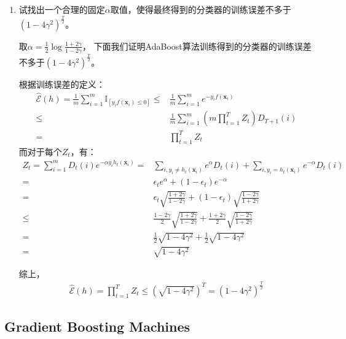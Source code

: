 \documentclass[12pt, a4paper]{article}
\newcommand{\vv}[1]{{\bm{#1}}}
\newcommand{\EE}{{\mathcal{E}}}
\newcommand{\unit}{{\mathbb{I}}}
\begin{document}
        \begin{enumerate}

        \item 试找出一个合理的固定$\alpha$取值，使得最终得到的分类器的训练误差不多于$(1 - 4 \gamma^2)^{\frac{T}{2}}$。

            取$\alpha = \frac{1}{2} \log \frac{1 + 2 \gamma}{1 - 2 \gamma}$，
            下面我们证明AdaBoost算法训练得到的分类器的训练误差不多于$(1 - 4 \gamma^2)^{\frac{T}{2}}$。

            根据训练误差的定义：
            \begin{align*}
            \hat{\EE}(h) = \frac{1}{m} \sum_{i = 1}^{m} \unit_{[y_i f(\vv{x}_i) \le 0]}
            \le& \frac{1}{m} \sum_{i = 1}^{m} e^{-y_i f(\vv{x}_i)} \\
            \le& \frac{1}{m} \sum_{i = 1}^{m} (m \prod_{t = 1}^{T} Z_t) D_{T + 1}(i) \\
            =& \prod_{t = 1}^{T} Z_t
            \end{align*}
            而对于每个$Z_t$，有：
            \begin{align*}
            Z_t = \sum_{i = 1}^{m} D_t(i) e^{-\alpha y_i h_t(\vv{x}_i)}
            =& \sum_{i, y_i \ne h_t(\vv{x}_i)} e^{\alpha} D_{t}(i) + \sum_{i, y_i = h_t(\vv{x}_i)} e^{-\alpha} D_{t}(i) \\
            =& \epsilon_t e^{\alpha} + (1 - \epsilon_t) e^{-\alpha} \\
            =& \epsilon_t \sqrt{\frac{1 + 2 \gamma}{1 - 2 \gamma}} + (1 - \epsilon_t) \sqrt{\frac{1 - 2 \gamma}{1 + 2 \gamma}} \\
            \le& \frac{1 - 2 \gamma}{2} \sqrt{\frac{1 + 2 \gamma}{1 - 2 \gamma}} + \frac{1 + 2 \gamma}{2} \sqrt{\frac{1 - 2 \gamma}{1 + 2 \gamma}} \\
            =& \frac{1}{2} \sqrt{1 - 4 \gamma^2} + \frac{1}{2} \sqrt{1 - 4 \gamma^2} \\
            =& \sqrt{1 - 4 \gamma^2}
            \end{align*}

            综上，
            \begin{align*}
            \hat{\EE}(h) = \prod_{t = 1}^{T} Z_t \le (\sqrt{1 - 4 \gamma^2})^T = (1 - 4 \gamma^2)^{\frac{T}{2}}
            \end{align*}

        \end{enumerate}

    \subsection{Gradient Boosting Machines}
\end{document}
